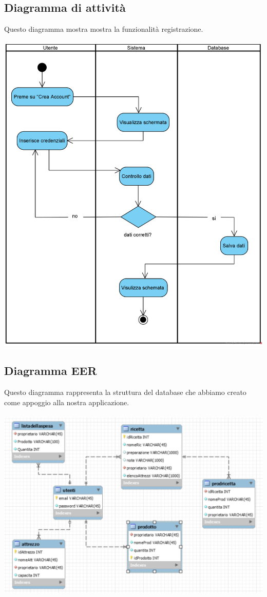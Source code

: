 \documentclass[a4paper, titlepage]{article}
\begin{document}
\subsection{Diagramma di attività}
Questo diagramma mostra mostra la funzionalità registrazione.\\\\
\includegraphics[scale=0.50]{Immagini/Activity Diagram Registrazione_Brew Day!.png}
\subsection{Diagramma EER}
Questo diagramma rappresenta la struttura del database che abbiamo creato come appoggio alla nostra applicazione.\\\\
\includegraphics[scale=0.50]{Immagini/diagrammaER.PNG}
\end{document}
